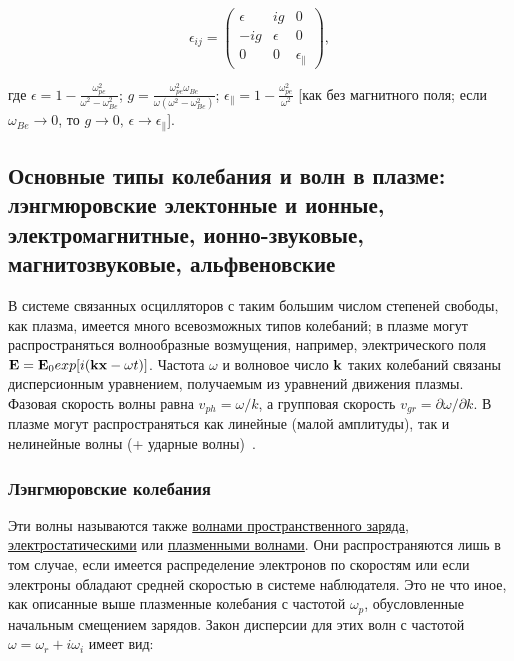 \documentclass[10pt, a4paper]{article}
\begin{document}
\begin{equation*}
	\epsilon_{ij} =
	\begin{pmatrix}
		\epsilon & ig & 0 \\
		-ig & \epsilon & 0 \\
		0 & 0 & \epsilon_\parallel
	\end{pmatrix},
\end{equation*}

где $\epsilon = 1-\frac{\omega_{pe}^2}{\omega^2-\omega_{Be}^2}$; $g = \frac{\omega_{pe}^2\omega_{Be}} {\omega\left(\omega^2-\omega_{Be}^2\right)}$; $\epsilon_\parallel = 1-\frac{\omega_{pe}^2}{\omega^2}$ [как без магнитного поля; если $\omega_{Be}\rightarrow 0$, то $g\rightarrow 0,\,\epsilon\rightarrow\epsilon_\parallel$].

\subsection{Основные типы колебания и волн в плазме: лэнгмюровские электонные и ионные, электромагнитные, ионно-звуковые, магнитозвуковые, альфвеновские}

В системе связанных осцилляторов с таким большим числом степеней свободы, как плазма, имеется много всевозможных типов колебаний; в плазме могут распространяться волнообразные возмущения, например, электрического поля $\vb{E}=\vb{E}_0exp[i(\vb{k}\vb{x}-\omega t)]$. Частота $\omega$ и волновое число $\vb{k}$ таких колебаний связаны дисперсионным уравнением, получаемым из уравнений движения плазмы. Фазовая скорость волны равна $v_{ph}=\omega/k$, а групповая скорость $v_{gr}=\partial\omega/\partial k$. В плазме могут распространяться как линейные (малой амплитуды), так и нелинейные волны (+ ударные волны)~\cite{kroll}.

\subsubsection{Лэнгмюровские колебания}

Эти волны называются также \uline{волнами пространственного заряда}, \uline{электростатическими} или \uline{плазменными волнами}. Они распространяются лишь в том случае, если имеется распределение электронов по скоростям или если электроны обладают средней скоростью в системе наблюдателя. Это не что иное, как описанные выше плазменные колебания с частотой $\omega_p$, обусловленные начальным смещением зарядов. Закон дисперсии для этих волн с частотой $\omega = \omega_r + i\omega_i$ имеет вид:
\end{document}
